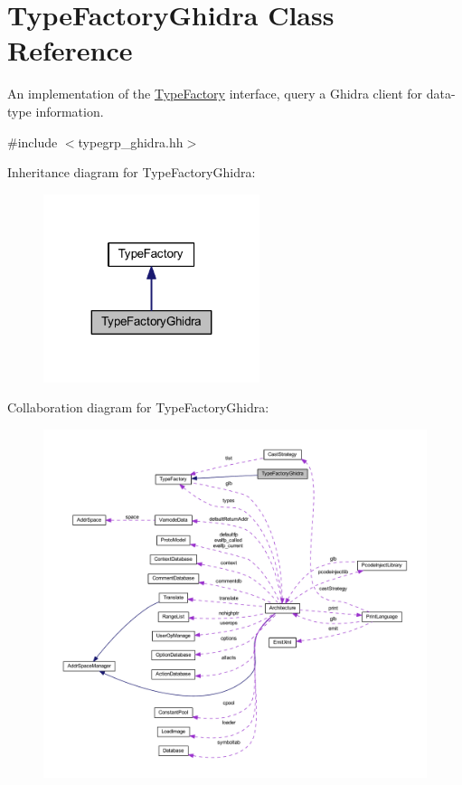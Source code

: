 \hypertarget{class_type_factory_ghidra}{}\section{Type\+Factory\+Ghidra Class Reference}
\label{class_type_factory_ghidra}


An implementation of the \mbox{\hyperlink{class_type_factory}{Type\+Factory}} interface, query a Ghidra client for data-\/type information.  




{\ttfamily \#include $<$typegrp\+\_\+ghidra.\+hh$>$}



Inheritance diagram for Type\+Factory\+Ghidra\+:
\nopagebreak
\begin{figure}[H]
\begin{center}
\leavevmode
\includegraphics[width=179pt]{class_type_factory_ghidra__inherit__graph}
\end{center}
\end{figure}


Collaboration diagram for Type\+Factory\+Ghidra\+:
\nopagebreak
\begin{figure}[H]
\begin{center}
\leavevmode
\includegraphics[width=350pt]{class_type_factory_ghidra__coll__graph}
\end{center}
\end{figure}
